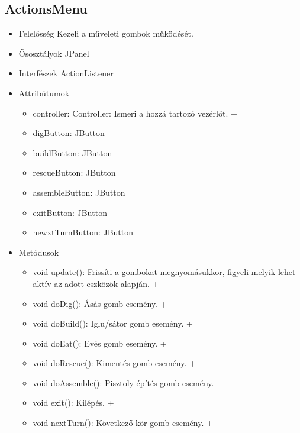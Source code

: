 \subsection{ActionsMenu}
\begin{itemize}
	\item Felelősség\newline
	Kezeli a műveleti gombok működését.
	\item Ősosztályok\newline
	JPanel
	\item Interfészek\newline
	ActionListener
	\item Attribútumok\newline
	\begin{itemize}
		\item controller: Controller: Ismeri a hozzá tartozó vezérlőt. +	
		\item digButton: JButton
		\item buildButton: JButton
		\item rescueButton: JButton
		\item assembleButton: JButton
		\item exitButton: JButton
		\item newxtTurnButton: JButton
	\end{itemize}
	\item Metódusok\newline
	\begin{itemize}
		\item void update(): Frissíti a gombokat megnyomásukkor, figyeli melyik lehet aktív az adott eszközök alapján. +
		\item void doDig(): Ásás gomb esemény. +
		\item void doBuild(): Iglu/sátor gomb esemény. +
		\item void doEat(): Evés gomb esemény. +
		\item void doRescue(): Kimentés gomb esemény. +
		\item void doAssemble(): Pisztoly építés gomb esemény. +
		\item void exit(): Kilépés. +
		\item void nextTurn(): Következő kör gomb esemény. +
	\end{itemize}
\end{itemize}

